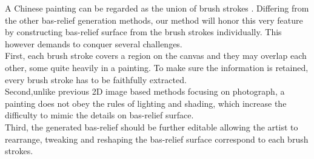 A Chinese painting can be regarded as the union of brush strokes \cite{xu2006animating}. Differing from the other bas-relief generation methods, our method will honor this very feature by constructing bas-relief surface from the brush strokes individually. This however demands to conquer several challenges. \\
First, each brush stroke covers a region on the canvas and they may overlap each other, some quite heavily in a painting. To make sure the information is retained, every brush stroke has to be faithfully extracted.\\ Second,unlike previous 2D image based methods focusing on photograph, a painting does not obey the rules of lighting and shading, which increase the difficulty to mimic the details on bas-relief surface. \\Third, the generated bas-relief should be further editable allowing the artist to rearrange, tweaking and reshaping the bas-relief surface correspond to each brush strokes. \\  \\
